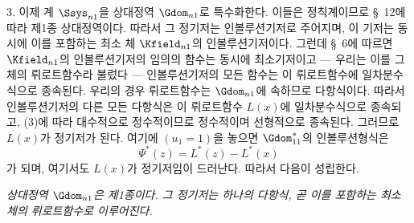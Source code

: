 
3. 이제 계 $\Ssys_{n1}$을 상대정역 $\Gdom_{n1}$로 특수화한다. 이들은 정칙계이므로 \S\ 12에 따라 제1종 상대정역이다. 따라서 그 정기저는 인볼루션기저로 주어지며, 이 기저는 동시에 이를 포함하는 최소 체 $\Kfield_{n1}$의 인볼루션기저이다. 그런데 \S\ 6에 따르면 $\Kfield_{n1}$의 인볼루션기저의 임의의 함수는 동시에 최소기저이고 --- 우리는 이를 그 체의 뤼로트함수라 불렀다 --- 인볼루션기저의 모든 함수는 이 뤼로트함수에 일차분수식으로 종속된다. 우리의 경우 뤼로트함수는 $\Gdom_{n1}$에 속하므로 다항식이다. 따라서 인볼루션기저의 다른 모든 다항식은 이 뤼로트함수 $L(x)$에 일차분수식으로 종속되고, (3)에 따라 대수적으로 정수적이므로 정수적이며 선형적으로 종속된다. 그러므로 $L(x)$가 정기저가 된다. 여기에 $(u_1=1)$을 놓으면 $\Gdom^*_{11}$의 인볼루션형식은
\[
  \Psi^*(z)=L^*(z)-L^*(x)
\]
가 되며, 여기서도 $L(x)$가 정기저임이 드러난다. 따라서 다음이 성립한다.

\emph{상대정역 $\Gdom_{n1}$은 제1종이다. 그 정기저는 하나의 다항식, 곧 이를 포함하는 최소 체의 뤼로트함수로 이루어진다.}

